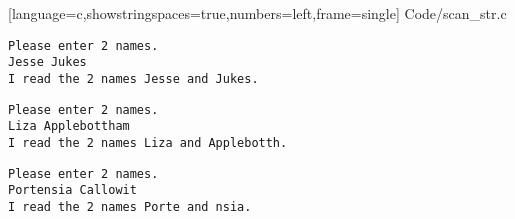 \begin{frame}[fragile] 

[language=c,showstringspaces=true,numbers=left,frame=single]
{Code/scan_str.c}
\end{frame}

\begin{frame}[fragile] 
\begin{lstlisting}[backgroundcolor=\color{blue!20}]
Please enter 2 names.
Jesse Jukes
I read the 2 names Jesse and Jukes.
\end{lstlisting}

\begin{lstlisting}[backgroundcolor=\color{blue!20}]
Please enter 2 names.
Liza Applebottham
I read the 2 names Liza and Applebotth.
\end{lstlisting}

\begin{lstlisting}[backgroundcolor=\color{blue!20}]
Please enter 2 names.
Portensia Callowit
I read the 2 names Porte and nsia.
\end{lstlisting}

\end{frame}